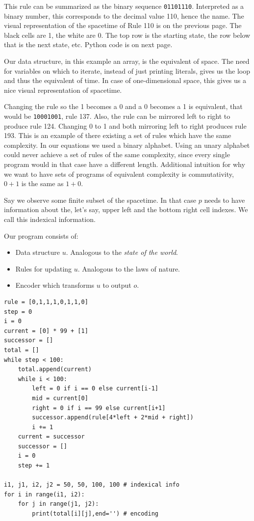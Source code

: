 This rule can be summarized as the binary sequence \texttt{01101110}.
Interpreted as a binary number, this corresponds to the decimal value 110, hence the name.
The visual representation of the spacetime of Rule 110 is on the previous page.
The black cells are 1, the white are 0.
The top row is the starting state, the row below that is the next state, etc.
Python code is on next page.

Our data structure, in this example an array, is the equivalent of space.
The need for variables on which to iterate, instead of just printing literals, gives us the loop and thus the equivalent of time.
In case of one-dimensional space, this gives us a nice visual representation of spacetime.

Changing the rule so the 1 becomes a 0 and a 0 becomes a 1 is equivalent, that would be \texttt{10001001}, rule 137.
Also, the rule can be mirrored left to right to produce rule 124.
Changing 0 to 1 and both mirroring left to right produces rule 193.
This is an example of there existing a set of rules which have the same complexity.
In our equations we used a binary alphabet. 
Using an unary alphabet could never achieve a set of rules of the same complexity, since every single program would in that case have a different length.
Additional intuition for why we want to have sets of programs of equivalent complexity is commutativity, $0+1$ is the same as $1+0$.

Say we observe some finite subset of the spacetime.
In that case $p$ needs to have information about the, let's say, upper left and the bottom right cell indexes.
We call this indexical information.

Our program consists of:
\begin{itemize}
\setlength\itemsep{0px}
\item Data structure $u$. Analogous to the \textit{state of the world}.
\item Rules for updating $u$. Analogous to the laws of nature.
\item Encoder which transforms $u$ to output $o$.
\end{itemize}

\newpage

\begin{lstlisting}[caption={A short program implementing Rule 110, together with indexical info. It prints a quite chaotic looking string of length 2500.}]
rule = [0,1,1,1,0,1,1,0]
step = 0 
i = 0
current = [0] * 99 + [1]
successor = []
total = []
while step < 100:
	total.append(current)
	while i < 100:
		left = 0 if i == 0 else current[i-1]
		mid = current[0]
		right = 0 if i == 99 else current[i+1]
		successor.append(rule[4*left + 2*mid + right])
		i += 1
	current = successor
	successor = []
	i = 0
	step += 1

i1, j1, i2, j2 = 50, 50, 100, 100 # indexical info
for i in range(i1, i2):
	for j in range(j1, j2):
		print(total[i][j],end='') # encoding
\end{lstlisting}

